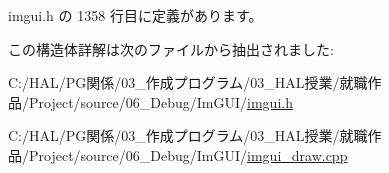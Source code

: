  imgui.\+h の 1358 行目に定義があります。



この構造体詳解は次のファイルから抽出されました\+:\begin{DoxyCompactItemize}
\item 
C\+:/\+H\+A\+L/\+P\+G関係/03\+\_\+作成プログラム/03\+\_\+\+H\+A\+L授業/就職作品/\+Project/source/06\+\_\+\+Debug/\+Im\+G\+U\+I/\mbox{\hyperlink{imgui_8h}{imgui.\+h}}\item 
C\+:/\+H\+A\+L/\+P\+G関係/03\+\_\+作成プログラム/03\+\_\+\+H\+A\+L授業/就職作品/\+Project/source/06\+\_\+\+Debug/\+Im\+G\+U\+I/\mbox{\hyperlink{imgui__draw_8cpp}{imgui\+\_\+draw.\+cpp}}\end{DoxyCompactItemize}
